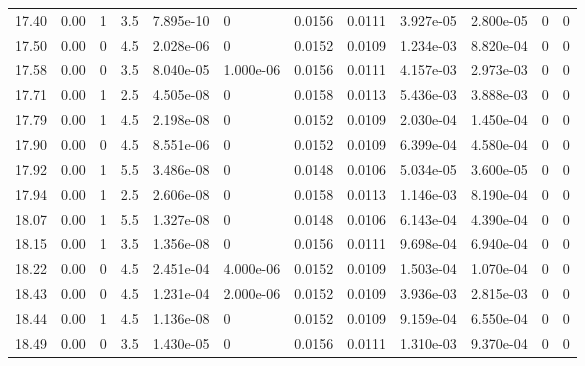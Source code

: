 \documentclass[preview]{standalone}
\begin{document}
{{{{{\begin{tabular}{L{1.2cm}C{1.2cm} C{0.3cm}C{0.5cm} C{1.4cm}C{1.4cm} C{1.4cm}C{1.4cm} C{1.6cm}C{1.6cm} C{1.6cm}C{1.6cm}}
  17.40  &  0.00  & 1     & 3.5 &  7.895e-10  & 0  &  0.0156&   0.0111& 3.927e-05 & 2.800e-05   &  0 & 0  \\ 
  17.50  &  0.00  & 0     & 4.5 &  2.028e-06  & 0  &  0.0152&   0.0109& 1.234e-03 & 8.820e-04   &  0 & 0  \\ 
  17.58  &  0.00  & 0     & 3.5 &  8.040e-05  & 1.000e-06  &  0.0156&   0.0111& 4.157e-03 & 2.973e-03   &  0 & 0  \\ 
  17.71  &  0.00  & 1     & 2.5 &  4.505e-08  & 0  &  0.0158&   0.0113& 5.436e-03 & 3.888e-03   &  0 & 0  \\ 
  17.79  &  0.00  & 1     & 4.5 &  2.198e-08  & 0  &  0.0152&   0.0109& 2.030e-04 & 1.450e-04   &  0 & 0  \\ 
  17.90  &  0.00  & 0     & 4.5 &  8.551e-06  & 0  &  0.0152&   0.0109& 6.399e-04 & 4.580e-04   &  0 & 0  \\ 
  17.92  &  0.00  & 1     & 5.5 &  3.486e-08  & 0  &  0.0148&   0.0106& 5.034e-05 & 3.600e-05   &  0 & 0  \\ 
  17.94  &  0.00  & 1     & 2.5 &  2.606e-08  & 0  &  0.0158&   0.0113& 1.146e-03 & 8.190e-04   &  0 & 0  \\ 
  18.07  &  0.00  & 1     & 5.5 &  1.327e-08  & 0  &  0.0148&   0.0106& 6.143e-04 & 4.390e-04   &  0 & 0  \\ 
  18.15  &  0.00  & 1     & 3.5 &  1.356e-08  & 0  &  0.0156&   0.0111& 9.698e-04 & 6.940e-04   &  0 & 0  \\ 
  18.22  &  0.00  & 0     & 4.5 &  2.451e-04  & 4.000e-06  &  0.0152&   0.0109& 1.503e-04 & 1.070e-04   &  0 & 0  \\ 
  18.43  &  0.00  & 0     & 4.5 &  1.231e-04  & 2.000e-06  &  0.0152&   0.0109& 3.936e-03 & 2.815e-03   &  0 & 0  \\ 
  18.44  &  0.00  & 1     & 4.5 &  1.136e-08  & 0  &  0.0152&   0.0109& 9.159e-04 & 6.550e-04   &  0 & 0  \\ 
  18.49  &  0.00  & 0     & 3.5 &  1.430e-05  & 0  &  0.0156&   0.0111& 1.310e-03 & 9.370e-04   &  0 & 0  \\ 
\hline 
\end{tabular} 

}}}}}
\end{document}
